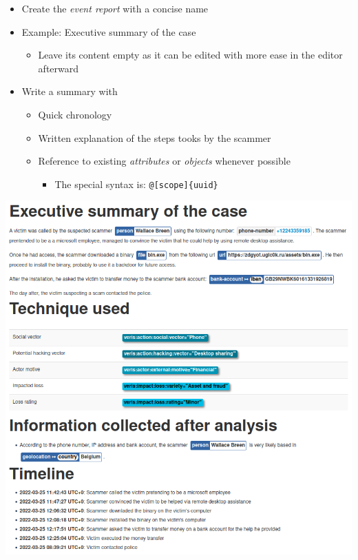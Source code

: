 \begin{frame}
    \begin{itemize}
        \item Create the \textit{event report} with a concise name
        \item Example: Executive summary of the case
        \begin{itemize}
            \item Leave its content empty as it can be edited with more ease in the editor afterward
        \end{itemize}
        \item Write a summary with
        \begin{itemize}
            \item Quick chronology
            \item Written explanation of the steps tooks by the scammer
            \item Reference to existing \textit{attributes} or \textit{objects} whenever possible
            \begin{itemize}
                \item The special syntax is: \texttt{@[scope]\{uuid\}}
            \end{itemize}
        \end{itemize}
    \end{itemize}
\end{frame}

\begin{frame}
    \vspace{-3pt}
    \begin{center}
        \includegraphics[width=0.64\linewidth]{pictures/case1/event-report.png}
    \end{center}
\end{frame}


